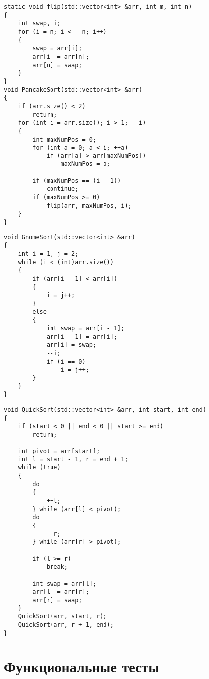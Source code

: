 \begin{lstlisting}[caption={Реализация алгоритма блинной сортировки и вспомогательной функции \texttt{flip}}, label={lst:pancake-sort}]
static void flip(std::vector<int> &arr, int m, int n)
{
    int swap, i;
    for (i = m; i < --n; i++)
    {
        swap = arr[i];
        arr[i] = arr[n];
        arr[n] = swap;
    }
}
void PancakeSort(std::vector<int> &arr)
{
    if (arr.size() < 2)
        return;
    for (int i = arr.size(); i > 1; --i)
    {
        int maxNumPos = 0;
        for (int a = 0; a < i; ++a)
            if (arr[a] > arr[maxNumPos])
                maxNumPos = a;

        if (maxNumPos == (i - 1))
            continue;
        if (maxNumPos >= 0)
            flip(arr, maxNumPos, i);
    }
}
\end{lstlisting}

\clearpage
\begin{lstlisting}[caption={Реализация алгоритма гномьей сортировки}, label={lst:gnome-sort}]
void GnomeSort(std::vector<int> &arr)
{
    int i = 1, j = 2;
    while (i < (int)arr.size())
    {
        if (arr[i - 1] < arr[i])
        {
            i = j++;
        }
        else
        {
            int swap = arr[i - 1];
            arr[i - 1] = arr[i];
            arr[i] = swap;
            --i;
            if (i == 0)
                i = j++;
        }
    }
}
\end{lstlisting}   

\begin{lstlisting}[caption={Реализация алгоритма быстрой сортировки}, label={lst:q-sort}]
void QuickSort(std::vector<int> &arr, int start, int end)
{
    if (start < 0 || end < 0 || start >= end)
        return;

    int pivot = arr[start];
    int l = start - 1, r = end + 1;
    while (true)
    {
        do
        {
            ++l;
        } while (arr[l] < pivot);
        do
        {
            --r;
        } while (arr[r] > pivot);

        if (l >= r)
            break;

        int swap = arr[l];
        arr[l] = arr[r];
        arr[r] = swap;
    }
    QuickSort(arr, start, r);
    QuickSort(arr, r + 1, end);
}
\end{lstlisting}


\section{Функциональные тесты}

